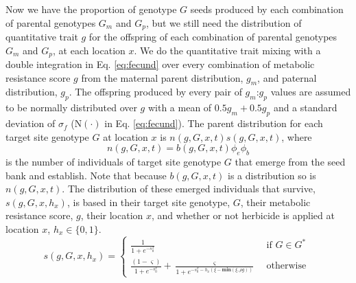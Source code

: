 \documentclass[12pt, a4paper]{article}
\begin{document}
Now we have the proportion of genotype $G$ seeds produced by each combination of parental genotypes $G_m$ and $G_p$, but we still need the distribution of quantitative trait $g$ for the offspring of each combination of parental genotypes $G_m$ and $G_p$, at each location $x$. We do the quantitative trait mixing with a double integration in Eq. \ref{eq:fecund} over every combination of metabolic resistance score $g$ from the maternal parent distribution, $g_m$, and paternal distribution, $g_p$. The offspring produced by every pair of $g_m$:$g_p$ values are assumed to be normally distributed over $g$ with a mean of $0.5g_m + 0.5g_p$ and a standard deviation of $\sigma_f$ ($\text{N}(\cdot)$ in Eq. \ref{eq:fecund}). The parent distribution for each target site genotype $G$ at location $x$ is $n(g, G, x, t)s(g, G, x, t)$, where 
\begin{equation}\label{eq:above_ground}
	n(g, G, x, t) = b(g, G, x, t)\phi_e\phi_b
\end{equation}
is the number of individuals of target site genotype $G$ that emerge from the seed bank and establish. Note that because $b(g, G, x, t)$ is a distribution so is $n(g, G, x, t)$. The distribution of these emerged individuals that survive, $s(g, G, x, h_x)$, is based in their target site genotype, $G$, their metabolic resistance score, $g$, their location $x$, and whether or not herbicide is applied at location $x$, $h_x \in \{0, 1\}$.   
\begin{equation}\label{eq:sur_G}
	s(g, G, x, h_x) = \begin{cases} 
		\frac{1}{1 + e^{-s_0^x}} &\text{~if~} G \in G^* \\
		\frac{(1 - \varsigma)}{1 + e^{-s_0^x}} + \frac{\varsigma}{1 + e^{-s_0^x - h_x\left(\xi - \textbf{min}(\xi, \rho g) \right)}} &\text{~otherwise~} 		
	\end{cases} 
\end{equation}
\end{document}
